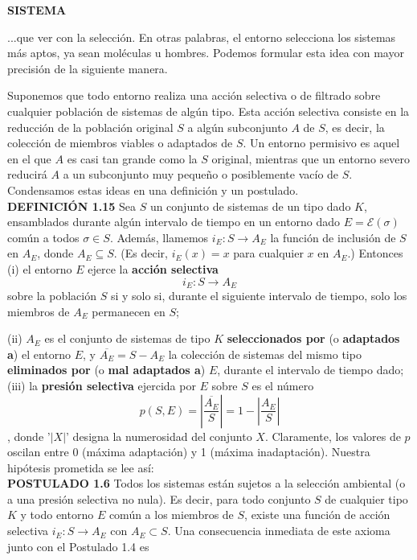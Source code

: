\newpage
\fancyhf{}
\fancyhead[r]{\thepage}
\begin{center}
{\fontsize{16}{18}\selectfont \textbf{SISTEMA}}
\end{center}
\vspace{0.5cm}

{\fontsize{13}{15}\selectfont
...que ver con la selección. En otras palabras, el entorno selecciona los sistemas más aptos, ya sean moléculas u hombres. Podemos formular esta idea con mayor precisión de la siguiente manera. \par

Suponemos que todo entorno realiza una acción selectiva o de filtrado sobre cualquier población de sistemas de algún tipo. Esta acción selectiva consiste en la reducción de la población original \( S \) a 
algún subconjunto \( A \) de \( S \), es decir, la colección de miembros viables o adaptados de \( S \). Un entorno permisivo es aquel en el que \( A \) es casi tan grande como la \( S \) original, mientras que un entorno severo reducirá \( A \) a un subconjunto muy pequeño o posiblemente vacío de \( S \). Condensamos estas ideas en una definición y un postulado.\\


\textbf{DEFINICIÓN 1.15} Sea \( S \) un conjunto de sistemas de un tipo dado \( K \), ensamblados durante algún intervalo de tiempo en un entorno dado \( E = \mathcal{E}(\sigma) \) común a todos \( \sigma \in S \). Además, llamemos \( i_E : S \rightarrow A_E \) la función de inclusión de \( S \) en \( A_E \), 
donde \( A_E \subseteq S \). (Es decir, \( i_E(x) = x \) para cualquier \( x \) en \( A_E \).) Entonces (i) el entorno \( E \) ejerce la \textbf{acción selectiva} \[ i_E : S \rightarrow A_E \] sobre la población \( S \) si y solo si, durante el siguiente intervalo de tiempo, solo los miembros de \( A_E \) permanecen en \( S \); \par 
(ii) \( A_E \) es el conjunto de sistemas de tipo \( K \) \textbf{seleccionados por} (o \textbf{adaptados a}) el entorno \( E \), y \( \overline{A_E} = S - A_E \) la colección de sistemas del mismo tipo \textbf{eliminados por} (o \textbf{mal adaptados a}) \( E \), 
durante el intervalo de tiempo dado; (iii) la \textbf{presión selectiva} ejercida por \( E \) sobre \( S \) es el número \[ p(S, E) = \left| \frac{\overline{A_E}}{S} \right| = 1 - \left| \frac{A_E}{S} \right| \], donde '\( |X| \)' designa la numerosidad del conjunto \( X \). Claramente, los valores de \( p \) oscilan entre 0 (máxima adaptación) y 1 (máxima inadaptación). 
Nuestra hipótesis prometida se lee así: \\

\textbf{POSTULADO 1.6} Todos los sistemas están sujetos a la selección ambiental (o a una presión selectiva no nula). Es decir, para todo conjunto \( S \) de cualquier tipo \( K \) y todo entorno \( E \) común a los miembros de \( S \), existe una función de acción selectiva \( i_E : S \rightarrow A_E \) con \( A_E \subset S \). Una consecuencia inmediata de este axioma junto con el Postulado 1.4 es
}

